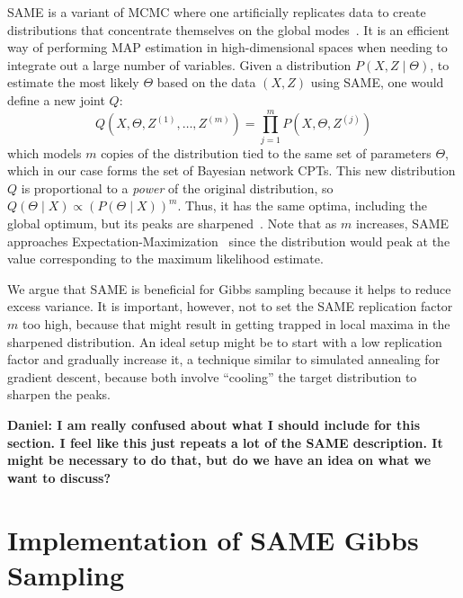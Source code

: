 \documentclass{article} %
\begin{document}
SAME is a variant of MCMC where one artificially replicates data to create distributions that
concentrate themselves on the global modes~\citep{SAME2002}. It is an efficient way of performing
MAP estimation in high-dimensional spaces when needing to integrate out a large number of variables.
Given a distribution $P(X,Z\mid \Theta)$, to estimate the most likely $\Theta$ based on the data
$(X,Z)$ using SAME, one would define a new joint $Q$:
\begin{equation}\label{eq:same}
Q(X,\Theta,Z^{(1)},\ldots,Z^{(m)}) = \prod_{j=1}^m P(X,\Theta,Z^{(j)})
\end{equation}
which models $m$ copies of the distribution tied to the same set of parameters $\Theta$, which in
our case forms the set of Bayesian network CPTs. This new distribution $Q$ is proportional to a
\emph{power} of the original distribution, so $Q(\Theta \mid X) \propto (P(\Theta \mid X))^m$. Thus,
it has the same optima, including the global optimum, but its peaks are sharpened~\citep{SAME2002}.
Note that as $m$ increases, SAME approaches Expectation-Maximization~\citep{EMpaper} since the
distribution would peak at the value corresponding to the maximum likelihood estimate.

We argue that SAME is beneficial for Gibbs sampling because it helps to reduce excess variance.  It
is important, however, not to set the SAME replication factor $m$ too high, because that might
result in getting trapped in local maxima in the sharpened distribution. An ideal setup might be to
start with a low replication factor and gradually increase it, a technique similar to simulated
annealing for gradient descent, because both involve ``cooling'' the target distribution to sharpen
the peaks.

\textbf{Daniel: I am really confused about what I should include for this section. I feel like this
just repeats a lot of the SAME description. It might be necessary to do that, but do we have an idea
on what we want to discuss?}




\section{Implementation of SAME Gibbs Sampling}\label{sec:implementation}
\end{document}
